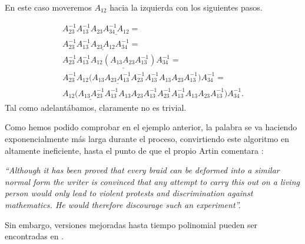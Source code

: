 \documentclass[TFG.tex]{subfiles}
\begin{document}
\begin{ej}
En este caso moveremos $A_{12}$ hacia la izquierda con los siguientes pasos.


\begin{gather*}
A_{23}^{-1}A_{13}^{-1}A_{23}\underline{A_{34}^{-1}A_{12}}=\\
A_{23}^{-1}A_{13}^{-1}\underline{A_{23}A_{12}}A_{34}^{-1}=\\
A_{23}^{-1}A_{13}^{-1}\underline{A_{12}(A_{13}A_{23}A_{13}^{-1})}A_{34}^{-1}=\\
A_{23}^{-1}\underline{A_{12}(A_{13}A_{23}A_{13}^{-1}A_{23}^{-1}A_{13}^{-1}}A_{13}A_{23}A_{13}^{-1})A_{34}^{-1}=\\
\underline{A_{12}(A_{13}A_{23}^{-1}A_{13}^{-1}}A_{13}A_{23}A_{13}^{-1}A_{23}^{-1}A_{13}^{-1}A_{13}A_{23}A_{13}^{-1})A_{34}^{-1}.
\end{gather*}
Tal como adelantábamos, claramente no es trivial.
\end{ej}

Como hemos podido comprobar en el ejemplo anterior, la palabra se va haciendo exponencialmente más larga durante el proceso, convirtiendo este algoritmo en altamente ineficiente, hasta el punto de que el propio Artin comentara \cite{Artin}:

\emph{``Although it has been proved that every braid can be deformed into a similar normal form the writer is
convinced that any attempt to carry this out on a living person would only lead to violent protests and
discrimination against mathematics. He would therefore discourage such an experiment''.}

Sin embargo, versiones mejoradas hasta tiempo polinomial pueden ser encontradas en \cite{polynomial}.



\end{document}
